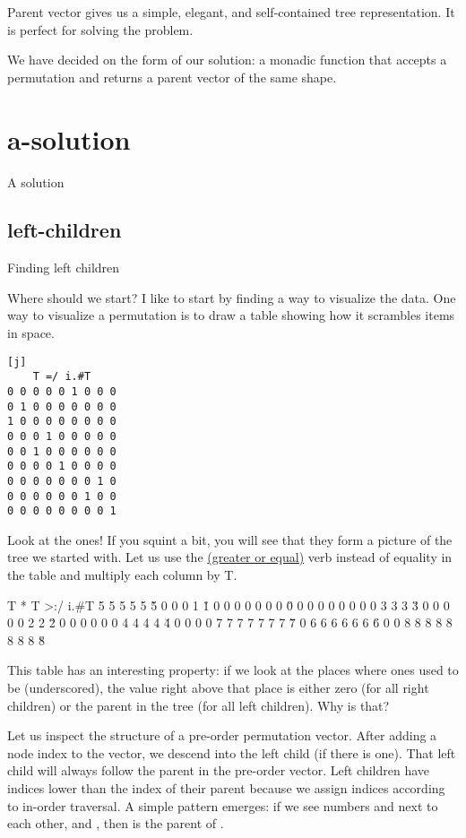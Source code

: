 \documentclass{article}
\begin{document}
Parent vector gives us a simple, elegant, and self-contained tree representation.
It is perfect for solving the problem.

We have decided on the form of our solution: a monadic function that accepts a permutation and returns a parent vector of the same shape.

\section{a-solution}{A solution}
\subsection{left-children}{Finding left children}

Where should we start?
I like to start by finding a way to visualize the data.
One way to visualize a permutation is to draw a table showing how it scrambles items in space.

\begin{verbatim}[j]
    T =/ i.#T
0 0 0 0 0 1 0 0 0
0 1 0 0 0 0 0 0 0
1 0 0 0 0 0 0 0 0
0 0 0 1 0 0 0 0 0
0 0 1 0 0 0 0 0 0
0 0 0 0 1 0 0 0 0
0 0 0 0 0 0 0 1 0
0 0 0 0 0 0 1 0 0
0 0 0 0 0 0 0 0 1
\end{verbatim}

Look at the ones!
If you squint a bit, you will see that they form a picture of the tree we started with.
Let us use the \href{https://code.jsoftware.com/wiki/Vocabulary/gtco#dyadic}{\code{>:} (greater or equal)} verb instead of equality in the table and multiply each column by T.

\begin{code}[j]
    T * T >:/ i.#T
5 5 5 5 5 \u{5} 0 0 0
1 \u{1} 0 0 0 0 0 0 0
\u{0} 0 0 0 0 0 0 0 0
3 3 3 \u{3} 0 0 0 0 0
2 2 \u{2} 0 0 0 0 0 0
4 4 4 4 \u{4} 0 0 0 0
7 7 7 7 7 7 7 \u{7} 0
6 6 6 6 6 6 \u{6} 0 0
8 8 8 8 8 8 8 8 \u{8}
\end{code}

This table has an interesting property: if we look at the places where ones used to be (underscored), the value right above that place is either zero (for all right children) or the parent in the tree (for all left children).
Why is that?

Let us inspect the structure of a pre-order permutation vector.
After adding a node index to the vector, we descend into the left child (if there is one).
That left child will always follow the parent in the pre-order vector.
Left children have indices lower than the index of their parent because we assign indices according to in-order traversal.
A simple pattern emerges: if we see numbers  and  next to each other, and , then  is the parent of .
\end{document}
